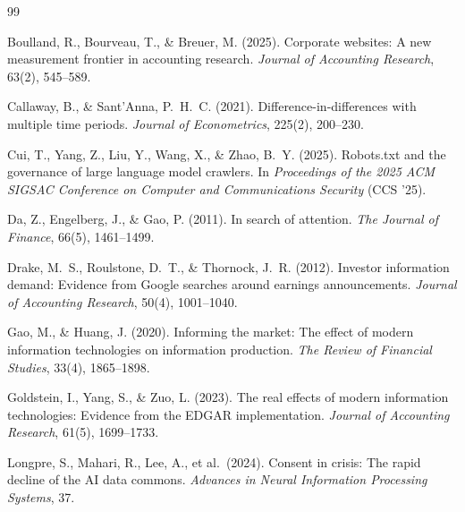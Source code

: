 \documentclass[11pt]{article}
\begin{document}
\begin{thebibliography}{99}

Boulland, R., Bourveau, T., \& Breuer, M. (2025). Corporate websites: A new
measurement frontier in accounting research. \textit{Journal of Accounting
Research}, 63(2), 545--589.

Callaway, B., \& Sant'Anna, P.~H.~C. (2021). Difference-in-differences with
multiple time periods. \textit{Journal of Econometrics}, 225(2), 200--230.

Cui, T., Yang, Z., Liu, Y., Wang, X., \& Zhao, B.~Y. (2025). Robots.txt and
the governance of large language model crawlers. In \textit{Proceedings of
the 2025 ACM SIGSAC Conference on Computer and Communications Security}
(CCS '25).

Da, Z., Engelberg, J., \& Gao, P. (2011). In search of attention.
\textit{The Journal of Finance}, 66(5), 1461--1499.

Drake, M.~S., Roulstone, D.~T., \& Thornock, J.~R. (2012). Investor
information demand: Evidence from Google searches around earnings
announcements. \textit{Journal of Accounting Research}, 50(4), 1001--1040.

Gao, M., \& Huang, J. (2020). Informing the market: The effect of modern
information technologies on information production. \textit{The Review of
Financial Studies}, 33(4), 1865--1898.

Goldstein, I., Yang, S., \& Zuo, L. (2023). The real effects of modern
information technologies: Evidence from the EDGAR implementation.
\textit{Journal of Accounting Research}, 61(5), 1699--1733.

Longpre, S., Mahari, R., Lee, A., et al.\ (2024). Consent in crisis: The
rapid decline of the AI data commons. \textit{Advances in Neural Information
Processing Systems}, 37.

\end{thebibliography}
\end{document}
